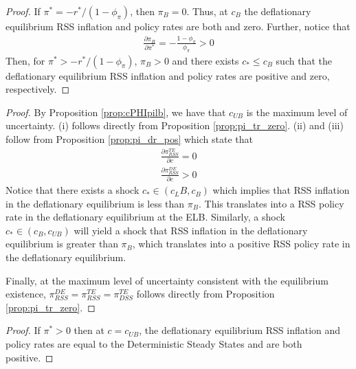 \documentclass[11pt]{article}
\begin{document}
\begin{singlespace}
		
		
		\corone*
		
		\begin{proof}
			If $\pi^* = -r^*/(1-\phi_{\pi})$, then $\pi_B = 0$. Thus, at $c_B$ the deflationary equilibrium RSS inflation and policy rates are both and zero. 
			Further, notice that 
			\begin{align*}
			\frac{\partial\pi_B}{\partial\pi^*} = -\frac{1-\phi_{\pi}}{\phi_{\pi}} > 0
			\end{align*}
			Then, for $\pi^* > -r^*/(1-\phi_{\pi})$, $\pi_B > 0$ and there exists $c_* \le c_B$ such that the deflationary equilibrium RSS inflation and policy rates are positive and zero, respectively.
		\end{proof}
		
		
		
		\propthree*
		\begin{proof}			
			By Proposition \ref{prop:cPHIpilb}, we have that $c_{UB}$ is the maximum level of uncertainty. (i) follows directly from Proposition \ref{prop:pi_tr_zero}.  (ii) and (iii) follow from Proposition  \ref{prop:pi_dr_pos} which state that
			\begin{align*}
			\frac{\partial\pi_{RSS}^{TE}}{\partial c} = 0\\
			\frac{\partial\pi_{RSS}^{DE}}{\partial c} > 0
			\end{align*} 
			Notice that there exists a shock $c_{*} \in (c_L{B}, c_{B})$ which implies that RSS inflation in the deflationary equilibrium is less than $\pi_{B}$. This translates into a RSS policy rate in the deflationary equilibrium at the ELB. Similarly, a shock $c_{*} \in (c_{B}, c_{UB})$ will yield a shock that RSS inflation in the deflationary equilibrium is greater than $\pi_{B}$, which translates into a positive RSS policy rate in the deflationary equilibrium.
			
			Finally, at the maximum level of uncertainty consistent with the equilibrium existence, $\pi_{RSS}^{DE} = \pi_{RSS}^{TE} = \pi_{DSS}^{TE}$  follows directly from Proposition \ref{prop:pi_tr_zero}.
		\end{proof}
		
		
		\cortwo*
		\begin{proof}
			If $\pi^* > 0$ then at $c = c_{UB}$, the deflationary equilibrium RSS inflation and policy rates are equal to the Deterministic Steady States and are both positive. 
		\end{proof}
		

\end{singlespace}
\end{document}
